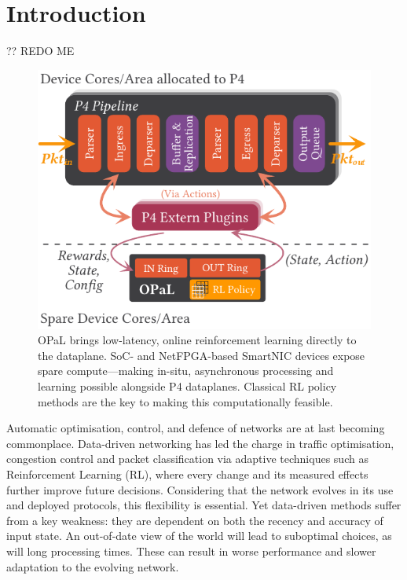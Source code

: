 \documentclass[sigconf,natbib=false]{acmart}
\newcommand{\approachshort}{OPaL}
\begin{document}
\setlength{\aweboxleftmargin}{0.12\linewidth}
\setlength{\aweboxcontentwidth}{1.97\linewidth}
	
\section{Introduction}
?? REDO ME

\begin{figure}
	\centering
	\includegraphics[keepaspectratio, width=0.9\linewidth]{figures/arch-with-p4}
	\caption{\approachshort{} brings low-latency, online reinforcement learning directly to the dataplane. SoC- and NetFPGA-based SmartNIC devices expose spare compute---making in-situ, asynchronous processing and learning possible alongside P4 dataplanes. Classical RL policy methods are the key to making this computationally feasible.\label{fig:netro-arch}}
\end{figure}

Automatic optimisation, control, and defence of networks are at last becoming commonplace. Data-driven networking has led the charge in traffic optimisation, congestion control and packet classification via adaptive techniques such as Reinforcement Learning (RL), where every change and its measured effects further improve future decisions. Considering that the network evolves in its use and deployed protocols, this flexibility is essential. Yet data-driven methods suffer from a key weakness: they are dependent on both the recency and accuracy of input state. An out-of-date view of the world will lead to suboptimal choices, as will long processing times. These can result in worse performance and slower adaptation to the evolving network.
\end{document}
